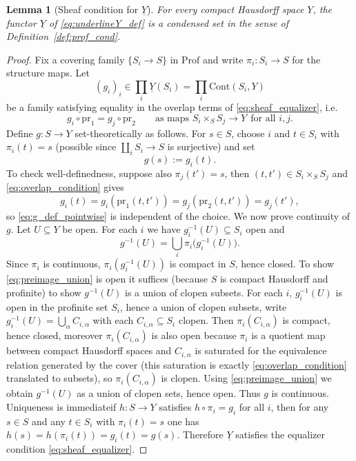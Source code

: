 \documentclass[11pt]{article}
\newtheorem{lemma}[theorem]{Lemma}
\theoremstyle{remark}
\begin{document}
{\begin{lemma}[Sheaf condition for $\underline{Y}$]\label{lem:underlineY_is_sheaf}
For every compact Hausdorff space $Y$, the functor $\underline{Y}$ of \eqref{eq:underlineY_def} is a condensed set in the sense of Definition~\ref{def:prof_cond}.
\end{lemma}
\begin{proof}
Fix a covering family $\{S_i\to S\}$ in $\mathrm{Prof}$ and write $\pi_i:S_i\to S$ for the structure maps. Let
\begin{equation}\label{eq:compatible_family}
(g_i)_{i}\in \prod_i \underline{Y}(S_i)=\prod_i \mathrm{Cont}(S_i,Y)
\end{equation}
be a family satisfying equality in the overlap terms of \eqref{eq:sheaf_equalizer}, i.e.
\begin{equation}\label{eq:overlap_condition}
g_i\circ \mathrm{pr}_1=g_j\circ \mathrm{pr}_2\qquad\text{as maps }S_i\times_S S_j\to Y\ \ \text{for all }i,j.
\end{equation}
Define $g:S\to Y$ set-theoretically as follows. For $s\in S$, choose $i$ and $t\in S_i$ with $\pi_i(t)=s$ (possible since $\coprod_i S_i\to S$ is surjective) and set
\begin{equation}\label{eq:g_def_pointwise}
g(s):=g_i(t).
\end{equation}
To check well-definedness, suppose also $\pi_j(t')=s$, then $(t,t')\in S_i\times_S S_j$ and \eqref{eq:overlap_condition} gives
\begin{equation}\label{eq:well_defined_check}
g_i(t)=g_i(\mathrm{pr}_1(t,t'))=g_j(\mathrm{pr}_2(t,t'))=g_j(t'),
\end{equation}
so \eqref{eq:g_def_pointwise} is independent of the choice. We now prove continuity of $g$. Let $U\subseteq Y$ be open. For each $i$ we have $g_i^{-1}(U)\subseteq S_i$ open and
\begin{equation}\label{eq:preimage_union}
g^{-1}(U)=\bigcup_i \pi_i\bigl(g_i^{-1}(U)\bigr).
\end{equation}
Since $\pi_i$ is continuous, $\pi_i(g_i^{-1}(U))$ is compact in $S$, hence closed. To show \eqref{eq:preimage_union} is open it suffices (because $S$ is compact Hausdorff and profinite) to show $g^{-1}(U)$ is a union of clopen subsets. For each $i$, $g_i^{-1}(U)$ is open in the profinite set $S_i$, hence a union of clopen subsets, write $g_i^{-1}(U)=\bigcup_\alpha C_{i,\alpha}$ with each $C_{i,\alpha}\subseteq S_i$ clopen. Then $\pi_i(C_{i,\alpha})$ is compact, hence closed, moreover $\pi_i(C_{i,\alpha})$ is also open because $\pi_i$ is a quotient map between compact Hausdorff spaces and $C_{i,\alpha}$ is saturated for the equivalence relation generated by the cover (this saturation is exactly \eqref{eq:overlap_condition} translated to subsets), so $\pi_i(C_{i,\alpha})$ is clopen. Using \eqref{eq:preimage_union} we obtain $g^{-1}(U)$ as a union of clopen sets, hence open. Thus $g$ is continuous. Uniqueness is immediate\:if $h:S\to Y$ satisfies $h\circ\pi_i=g_i$ for all $i$, then for any $s\in S$ and any $t\in S_i$ with $\pi_i(t)=s$ one has $h(s)=h(\pi_i(t))=g_i(t)=g(s)$. Therefore $\underline{Y}$ satisfies the equalizer condition \eqref{eq:sheaf_equalizer}.
\end{proof}

}
\end{document}
